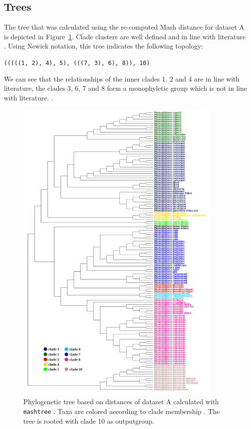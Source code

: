 \subsection*{Trees}
The tree that was calculated using the re-computed Mash distance for dataset
A is depicted in Figure~\ref{fig:mandalMashTree}. Clade clusters are well
defined and in line with literature
\cite{abadPhytophthoraTaxonomicPhylogenetic2023a,yangExpandedPhylogenyGenus2017}.
Using Newick notation, this tree indicates the following topology: 

\texttt{(((((1, 2), 4), 5), (((7, 3), 6), 8)), 10)}

We can see that the relationships of the inner clades 1, 2 and 4 are in line
with literature, the clades 3, 6, 7 and 8 form a monophyletic group which is not
in line with literature.
\cite{abadPhytophthoraTaxonomicPhylogenetic2023a,yangExpandedPhylogenyGenus2017}.

\begin{figure}
  \centering
  \includegraphics[width=0.9\textwidth]{figures/mashtree_mandal_tree_k21_s2000.png}
  \caption{Phylogenetic tree based on distances of dataset A calculated with
  \texttt{mashtree}
  \cite{ondovMashFastGenome2016,katzMashtreeRapidComparison2019}. Taxa are
  colored according to clade membership
  \cite{abadPhytophthoraTaxonomicPhylogenetic2023a}. The tree is rooted with
  clade 10 as outputgroup.}
  \label{fig:mandalMashTree}
\end{figure}

